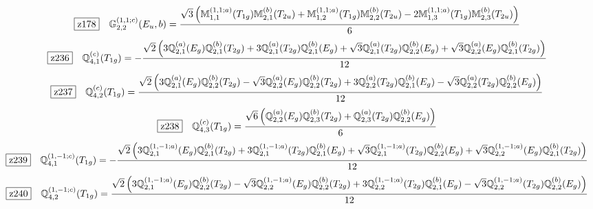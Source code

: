\documentclass[fleqn,10pt,landscape]{jsarticle}
\begin{document}
\begin{dmath*}
\hspace*{3mm}\fbox{z178}\quad \mathbb{G}_{2,2}^{(1,1;c)}(E_{u},b)=\frac{\sqrt{3} \left(\mathbb{M}_{1,1}^{(1,1;a)}(T_{1g}) \mathbb{M}_{2,1}^{(b)}(T_{2u}) + \mathbb{M}_{1,2}^{(1,1;a)}(T_{1g}) \mathbb{M}_{2,2}^{(b)}(T_{2u}) - 2 \mathbb{M}_{1,3}^{(1,1;a)}(T_{1g}) \mathbb{M}_{2,3}^{(b)}(T_{2u})\right)}{6}
\end{dmath*}
\begin{dmath*}
\hspace*{3mm}\fbox{z236}\quad \mathbb{Q}_{4,1}^{(c)}(T_{1g})=- \frac{\sqrt{2} \left(3 \mathbb{Q}_{2,1}^{(a)}(E_{g}) \mathbb{Q}_{2,1}^{(b)}(T_{2g}) + 3 \mathbb{Q}_{2,1}^{(a)}(T_{2g}) \mathbb{Q}_{2,1}^{(b)}(E_{g}) + \sqrt{3} \mathbb{Q}_{2,1}^{(a)}(T_{2g}) \mathbb{Q}_{2,2}^{(b)}(E_{g}) + \sqrt{3} \mathbb{Q}_{2,2}^{(a)}(E_{g}) \mathbb{Q}_{2,1}^{(b)}(T_{2g})\right)}{12}
\end{dmath*}
\begin{dmath*}
\hspace*{3mm}\fbox{z237}\quad \mathbb{Q}_{4,2}^{(c)}(T_{1g})=\frac{\sqrt{2} \left(3 \mathbb{Q}_{2,1}^{(a)}(E_{g}) \mathbb{Q}_{2,2}^{(b)}(T_{2g}) - \sqrt{3} \mathbb{Q}_{2,2}^{(a)}(E_{g}) \mathbb{Q}_{2,2}^{(b)}(T_{2g}) + 3 \mathbb{Q}_{2,2}^{(a)}(T_{2g}) \mathbb{Q}_{2,1}^{(b)}(E_{g}) - \sqrt{3} \mathbb{Q}_{2,2}^{(a)}(T_{2g}) \mathbb{Q}_{2,2}^{(b)}(E_{g})\right)}{12}
\end{dmath*}
\begin{dmath*}
\hspace*{3mm}\fbox{z238}\quad \mathbb{Q}_{4,3}^{(c)}(T_{1g})=\frac{\sqrt{6} \left(\mathbb{Q}_{2,2}^{(a)}(E_{g}) \mathbb{Q}_{2,3}^{(b)}(T_{2g}) + \mathbb{Q}_{2,3}^{(a)}(T_{2g}) \mathbb{Q}_{2,2}^{(b)}(E_{g})\right)}{6}
\end{dmath*}
\begin{dmath*}
\hspace*{3mm}\fbox{z239}\quad \mathbb{Q}_{4,1}^{(1,-1;c)}(T_{1g})=- \frac{\sqrt{2} \left(3 \mathbb{Q}_{2,1}^{(1,-1;a)}(E_{g}) \mathbb{Q}_{2,1}^{(b)}(T_{2g}) + 3 \mathbb{Q}_{2,1}^{(1,-1;a)}(T_{2g}) \mathbb{Q}_{2,1}^{(b)}(E_{g}) + \sqrt{3} \mathbb{Q}_{2,1}^{(1,-1;a)}(T_{2g}) \mathbb{Q}_{2,2}^{(b)}(E_{g}) + \sqrt{3} \mathbb{Q}_{2,2}^{(1,-1;a)}(E_{g}) \mathbb{Q}_{2,1}^{(b)}(T_{2g})\right)}{12}
\end{dmath*}
\begin{dmath*}
\hspace*{3mm}\fbox{z240}\quad \mathbb{Q}_{4,2}^{(1,-1;c)}(T_{1g})=\frac{\sqrt{2} \left(3 \mathbb{Q}_{2,1}^{(1,-1;a)}(E_{g}) \mathbb{Q}_{2,2}^{(b)}(T_{2g}) - \sqrt{3} \mathbb{Q}_{2,2}^{(1,-1;a)}(E_{g}) \mathbb{Q}_{2,2}^{(b)}(T_{2g}) + 3 \mathbb{Q}_{2,2}^{(1,-1;a)}(T_{2g}) \mathbb{Q}_{2,1}^{(b)}(E_{g}) - \sqrt{3} \mathbb{Q}_{2,2}^{(1,-1;a)}(T_{2g}) \mathbb{Q}_{2,2}^{(b)}(E_{g})\right)}{12}
\end{dmath*}
\end{document}
